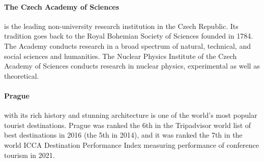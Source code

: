 \documentclass[12pt]{extarticle}
\begin{document}
\paragraph{The Czech Academy of Sciences} is the leading
non-university research institution in the Czech Republic. Its
tradition goes back to the Royal Bohemian Society of Sciences founded
in 1784. The Academy conducts
research in a broad spectrum of natural, technical, and social
sciences and humanities.
The Nuclear Physics Institute of the Czech Academy of
Sciences conducts research in
nuclear physics, experimental as well as theoretical.

\paragraph{Prague} with its rich history and stunning architecture is
one of the world's most popular tourist destinations.
Prague was ranked the 6th in the Tripadvisor world list of best
destinations in 2016 (the 5th in 2014), and it was ranked the 7th in
the world ICCA Destination Performance Index measuring performance of
conference tourism in 2021.
\end{document}
